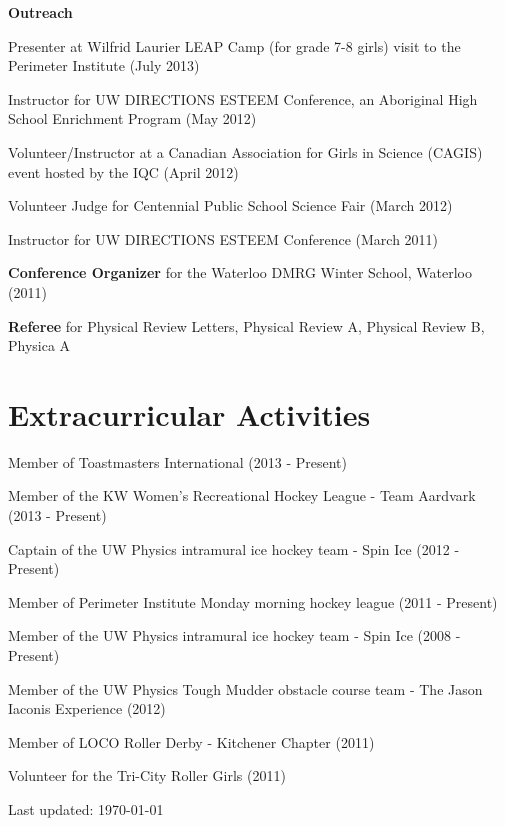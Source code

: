 \documentclass[letterpaper]{article}
\def\footerlink{http://jblevins.org/projects/cv-template/}
\renewenvironment{itemize}{
  \begin{list}{}{
    \setlength{\leftmargin}{1.5em}
  }
}{
  \end{list}
}
\begin{document}
\begin{itemize}

\item {\bf Outreach} 
	\begin{itemize}
	
	\item Presenter at Wilfrid Laurier LEAP Camp (for grade 7-8 girls) visit to the Perimeter Institute (July 2013)
	\item Instructor for UW DIRECTIONS ESTEEM Conference, an Aboriginal High School Enrichment Program (May 2012)
	\item Volunteer/Instructor at a Canadian Association for Girls in Science (CAGIS) event hosted by the IQC (April 2012)
	\item Volunteer Judge for Centennial Public School Science Fair (March 2012)
	\item Instructor for UW DIRECTIONS ESTEEM Conference (March 2011)
	\end{itemize}

\item {\bf Conference Organizer} for the Waterloo DMRG Winter School, Waterloo (2011)	
\item {\bf Referee} for Physical Review Letters, Physical Review A, Physical Review B, Physica A
\end{itemize}

\section*{Extracurricular Activities}

\begin{itemize}

\item Member of Toastmasters International (2013 - Present)
\item Member of the KW Women's Recreational Hockey League - Team Aardvark (2013 - Present)
\item Captain of the UW Physics intramural ice hockey team - Spin Ice (2012 - Present)
\item Member of Perimeter Institute Monday morning hockey league (2011 - Present)
\item Member of the UW Physics intramural ice hockey team - Spin Ice (2008 - Present)
\item Member of the UW Physics Tough Mudder obstacle course team - The Jason Iaconis Experience (2012)
\item Member of LOCO Roller Derby - Kitchener Chapter (2011)
\item Volunteer for the Tri-City Roller Girls (2011)

\end{itemize}

\bigskip

\begin{center}
  \begin{footnotesize}
    Last updated: \today \\
  \end{footnotesize}
\end{center}
\end{document}
